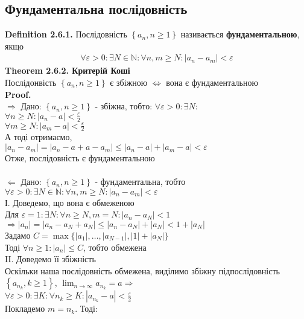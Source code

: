 \documentclass[a4paper, 14pt]{extarticle}
\def\huge{\displaystyle}
\def\sequence#1{$\displaystyle \left\{ {#1}, n\geq1 \right\}$}
\def\subsequence#1{$\displaystyle \left\{ {#1}, k\geq1 \right\}$}
\begin{document}
	\subsection{Фундаментальна послідовність}
	\textbf{Definition 2.6.1.} Послідовність \sequence{a_n} називається \textbf{фундаментальною}, якщо
	\begin{align*}
	\forall \varepsilon > 0: \exists N \in \mathbb{N}: \forall n,m \geq N: |a_n - a_m| < \varepsilon
	\end{align*}
	\textbf{Theorem 2.6.2. Критерій Коші}\\
	Послідонвість \sequence{a_n} є збіжною $\iff$ вона є фундаментальною\\
	\textbf{Proof.}\\
	$\boxed{\Rightarrow}$ Дано: \sequence{a_n} - збіжна, тобто: $\forall \varepsilon >0: \exists N: $\\
	$\huge \forall n \geq N: |a_n - a| < \frac{\varepsilon}{2}$\\
	$\huge \forall m \geq N: |a_m - a| < \frac{\varepsilon}{2}$\\
	А тоді отримаємо,\\
	$|a_n - a_m| = |a_n - a + a - a_m| \leq |a_n - a| + |a_m - a| < \varepsilon$\\
	Отже, послідовність є фундаментальною\\
	\\
	$\boxed{\Leftarrow}$ Дано: \sequence{a_n} - фундаментальна, тобто\\
	$\forall \varepsilon > 0: \exists N \in \mathbb{N}: \forall n,m \geq N: |a_n - a_m| < \varepsilon$\\
	І. Доведемо, що вона є обмеженою\\
	Для $\varepsilon = 1: \exists N: \forall n \geq N, m = N: |a_n - a_N| < 1$\\
	$\Rightarrow |a_n| = |a_n - a_N + a_N| \leq |a_n - a_N| + |a_N| < 1 + |a_N|$\\
	Задамо $C = \max\{|a_1|, \dots, |a_{N-1}|, |1|+|a_N|\}$\\
	Тоді $\forall n \geq 1: |a_n| \leq C$, тобто обмежена\\
	II. Доведемо її збіжність\\
	Оскільки наша послідовність обмежена, виділимо збіжну підпослідовність \subsequence{a_{n_k}}, $\huge \lim_{n \to \infty} a_{n_k} = a \Rightarrow$\\
	$\huge \forall \varepsilon > 0: \exists K: \forall n_k \geq K: |a_{n_k} - a| < \frac{\varepsilon}{2}$\\
	Покладемо $m = n_k$. Тоді:\\
\end{document}

